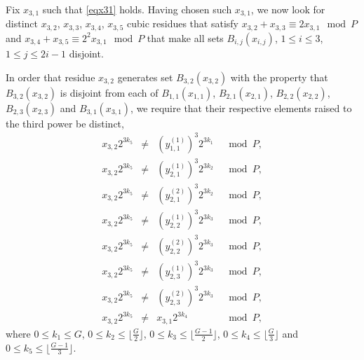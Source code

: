 Fix $x_{3,1}$ such that \eqref{eqx31} holds. Having chosen such
$x_{3,1}$, we now look for distinct $x_{3,2}$, $x_{3,3}$, $x_{3,4}$,
$x_{3,5}$ cubic residues that satisfy $x_{3,2}+x_{3,3} \equiv
2x_{3,1} \mod P$ and $x_{3,4}+x_{3,5} \equiv 2^2x_{3,1} \mod P$ that
make all sets $B_{i,j}(x_{i,j})$, $1 \leq i \leq 3$, $1 \leq j \leq
2i-1$ disjoint.

In order that residue $x_{3,2}$ generates set $B_{3,2}(x_{3,2})$
with the property that $B_{3,2}(x_{3,2})$ is disjoint from each of
$B_{1,1}(x_{1,1})$, $B_{2,1}(x_{2,1})$, $B_{2,2}(x_{2,2})$,
$B_{2,3}(x_{2,3})$ and $B_{3,1}(x_{3,1})$, we require that their
respective elements raised to the third power be distinct,
\begin{equation}\label{eqx32}\begin{array}{cccc}
x_{3,2}2^{3k_5} &\neq& (y_{1,1}^{(1)})^3 2^{3k_1} &\mod P, \\
x_{3,2}2^{3k_5} &\neq& (y_{2,1}^{(1)})^3 2^{3k_2} &\mod P, \\
x_{3,2}2^{3k_5} &\neq& (y_{2,1}^{(2)})^3 2^{3k_2} &\mod P, \\
x_{3,2}2^{3k_5} &\neq& (y_{2,2}^{(1)})^3 2^{3k_3} &\mod P, \\
x_{3,2}2^{3k_5} &\neq& (y_{2,2}^{(2)})^3 2^{3k_3} &\mod P, \\
x_{3,2}2^{3k_5} &\neq& (y_{2,3}^{(1)})^3 2^{3k_3} &\mod P, \\
x_{3,2}2^{3k_5} &\neq& (y_{2,3}^{(2)})^3 2^{3k_3} &\mod P, \\
x_{3,2}2^{3k_5} &\neq& x_{3,1} 2^{3k_4} &\mod P,
\end{array}\end{equation}
where $0 \leq k_1 \leq G$, $0 \leq k_2 \leq \lfloor \frac{G}{2}
\rfloor$, $0 \leq k_3 \leq \lfloor\frac{G-1}{2} \rfloor$, $0 \leq
k_4 \leq \lfloor\frac{G}{3} \rfloor$ and $0 \leq k_5 \leq
\lfloor\frac{G-1}{3} \rfloor$.

